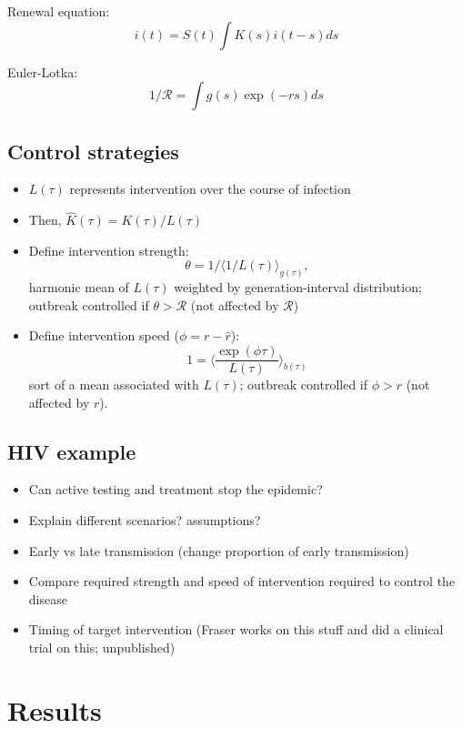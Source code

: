 \documentclass{article}\usepackage[]{graphicx}\usepackage[]{color}
\newcommand{\RR}{\ensuremath{{\mathcal R}}}
\begin{document}
Renewal equation:
\begin{equation}
i(t) = S(t) \int K(s) i(t-s) ds
\end{equation}

Euler-Lotka:
\begin{equation}
1/\RR = \int g(s) \exp(-rs) ds
\end{equation}

\subsection{Control strategies}

\begin{itemize}
	\item $L(\tau)$ represents intervention over the course of infection
	\item Then, $\hat K(\tau) = K(\tau)/L(\tau)$
	\item Define intervention strength:
	$$
	\theta = 1/\langle 1/L(\tau) \rangle_{g(\tau)},
	$$
	harmonic mean of $L(\tau)$ weighted by generation-interval distribution; outbreak controlled if $\theta > \mathcal R$ (not affected by $\RR$)
	\item Define intervention speed ($\phi = r - \hat r$):
	$$
	1 = \langle \frac{\exp(\phi \tau) }{L(\tau)} \rangle_{b(\tau)}
	$$
	sort of a mean associated with $L(\tau)$; outbreak controlled if $\phi > r$ (not affected by $r$).
\end{itemize}

\subsection{HIV example}

\begin{itemize}
	\item Can active testing and treatment stop the epidemic?
	\item Explain different scenarios? assumptions?
	\item Early vs late transmission (change proportion of early transmission)
	\item Compare required strength and speed of intervention required to control the disease
	\item Timing of target intervention (Fraser works on this stuff and did a clinical trial on this; unpublished)
\end{itemize}

\section{Results}
\end{document}
